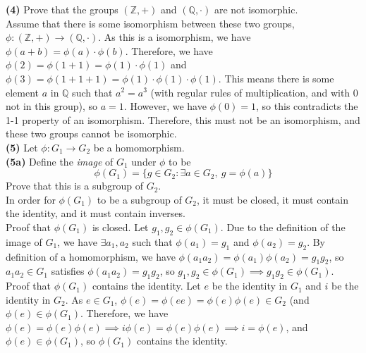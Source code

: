 \documentclass[12pt,letterpaper]{article}
\begin{document}
\textbf{(4)} Prove that the groups \((\mathbb{Z}, +)\) and \((\mathbb{Q}, \cdot)\) are not isomorphic. \\

Assume that there is some isomorphism between these two groups, \(\phi : (\mathbb{Z},+) \to (\mathbb{Q},\cdot)\).  As this is a isomorphism, we have \(\phi(a+b) = \phi(a) \cdot \phi(b)\). Therefore, we have \(\phi(2) = \phi(1+1) = \phi(1)\cdot\phi(1)\) and \(\phi(3) = \phi(1+1+1) = \phi(1)\cdot\phi(1)\cdot\phi(1)\). This means there is some element \(a\) in \(\mathbb{Q}\) such that \(a^{2} = a^{3}\) (with regular rules of multiplication, and with 0 not in this group), so \(a=1\). However, we have \(\phi(0) = 1\), so this contradicts the 1-1 property of an isomorphism. Therefore, this must not be an isomorphism, and these two groups cannot be isomorphic. \\

\textbf{(5)} Let \(\phi : G_{1} \to G_{2}\) be a homomorphism. \\

\textbf{(5a)} Define the \textit{image} of \(G_{1}\) under \(\phi\) to be \[\phi(G_{1}) = \{g \in G_{2} : \exists a \in G_{2},\ g = \phi(a)\}\] Prove that this is a subgroup of \(G_{2}\). \\

In order for \(\phi(G_{1})\) to be a subgroup of \(G_{2}\), it must be closed, it must contain the identity, and it must contain inverses. \\

Proof that \(\phi(G_{1})\) is closed. Let \(g_{1}, g_{2} \in \phi(G_{1})\). Due to the definition of the image of \(G_{1}\), we have \(\exists a_{1},a_{2}\) such that \(\phi(a_{1}) = g_{1}\) and \(\phi(a_{2}) = g_{2}\). By definition of a homomorphism, we have \(\phi(a_{1}a_{2}) = \phi(a_{1})\phi(a_{2}) = g_{1}g_{2}\), so \(a_{1}a_{2} \in G_{1}\) satisfies \(\phi(a_{1}a_{2}) = g_{1}g_{2}\), so \(g_{1},g_{2} \in \phi(G_{1})  \implies g_{1}g_{2} \in \phi(G_{1})\). \\

Proof that \(\phi(G_{1})\) contains the identity. Let \(e\) be the identity in \(G_{1}\) and \(i\) be the identity in \(G_{2}\). As \(e \in G_{1}\), \(\phi(e) = \phi(ee) = \phi(e)\phi(e) \in G_{2}\) (and \(\phi(e) \in \phi(G_{1})\). Therefore, we have \(\phi(e) = \phi(e)\phi(e) \implies i\phi(e) = \phi(e)\phi(e) \implies i = \phi(e)\), and \(\phi(e) \in \phi(G_{1})\), so \(\phi(G_{1})\) contains the identity. \\
\end{document}

